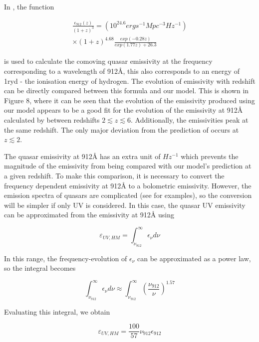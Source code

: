 \documentclass[12pt, twocolumn]{report}%
\begin{document}
In \cite{Haardt_Madau}, the function

\begin{multline}
    \frac{\epsilon_{912}(z)}{(1+z)^3}=(10^{24.6}erg s^{-1}Mpc^{-3}Hz^{-1})\\
    \times(1+z)^{4.68}\frac{exp(-0.28z)}{exp(1.77z)+26.3}
\end{multline}

\noindent is used to calculate the comoving quasar emissivity at the frequency corresponding to a wavelength of 912\AA, this also corresponds to an energy of 1ryd - the ionisation energy of hydrogen. The evolution of emissivity with redshift can be directly compared between this formula and our model. This is shown in Figure 8, where it can be seen that the evolution of the emissivity produced using our model appears to be a good fit for the evolution of the emissivity at 912\AA \: calculated by \cite{Haardt_Madau} between redshifts $2\lesssim z\lesssim6$. Additionally, the emissivities peak at the same redshift. The only major deviation from the prediction of \citeauthor{Haardt_Madau} occurs at $z\lesssim2$.\par

The quasar emissivity at 912\AA \: has an extra unit of $Hz^{-1}$ which prevents the magnitude of the emissivity from being compared with our model's prediction at a given redshift. To make this comparison, it is necessary to convert the frequency dependent emissivity at 912\AA \: to a bolometric emissivity. However, the emission spectra of quasars are complicated (see \cite{QSO_Spectrum} for examples), so the conversion will be simpler if only UV is considered. In this case, the quasar UV emissivity can be approximated from the emissivity at 912\AA \: using

\begin{equation}
    \varepsilon_{UV,HM}=\int_{\nu_{912}}^{\infty}\epsilon_\nu d\nu
\end{equation}

\noindent In this range, the frequency-evolution of $\epsilon_\nu$ can be approximated as a power law, so the integral becomes

\begin{equation}
    \int_{\nu_{912}}^{\infty}\epsilon_\nu d\nu\approx\int_{\nu_{912}}^{\infty}\left(\frac{\nu_{912}}{\nu}\right)^{1.57}
\end{equation}

\noindent Evaluating this integral, we obtain

\begin{equation}
    \varepsilon_{UV,HM}=\frac{100}{57}\nu_{912}\epsilon_{912}
\end{equation}
\end{document}
